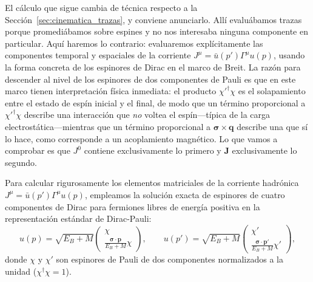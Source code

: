 \documentclass[10pt,a4paper]{article}
\begin{document}
El cálculo que sigue cambia de técnica respecto a la Sección~\ref{sec:cinematica_trazas}, y conviene anunciarlo. Allí evaluábamos trazas porque promediábamos sobre espines y no nos interesaba ninguna componente en particular. Aquí haremos lo contrario: evaluaremos explícitamente las componentes temporal y espaciales de la corriente $J^\mu = \bar{u}(p')\Gamma^\mu u(p)$, usando la forma concreta de los espinores de Dirac en el marco de Breit. La razón para descender al nivel de los espinores de dos componentes de Pauli es que en este marco tienen interpretación física inmediata: el producto $\chi'^\dagger\chi$ es el solapamiento entre el estado de espín inicial y el final, de modo que un término proporcional a $\chi'^\dagger\chi$ describe una interacción que \emph{no} voltea el espín---típica de la carga electrostática---mientras que un término proporcional a $\boldsymbol{\sigma}\times\mathbf{q}$ describe una que sí lo hace, como corresponde a un acoplamiento magnético. Lo que vamos a comprobar es que $J^0$ contiene exclusivamente lo primero y $\mathbf{J}$ exclusivamente lo segundo.

Para calcular rigurosamente los elementos matriciales de la corriente hadrónica $J^\mu = \bar{u}(p')\Gamma^\mu u(p)$, empleamos la solución exacta de espinores de cuatro componentes de Dirac para fermiones libres de energía positiva en la representación estándar de Dirac-Pauli:
\begin{equation}
u(p) = \sqrt{E_B + M} \begin{pmatrix} \chi \\ \frac{\boldsymbol{\sigma} \cdot \mathbf{p}}{E_B + M} \chi \end{pmatrix}, \qquad
u(p') = \sqrt{E_B + M} \begin{pmatrix} \chi' \\ \frac{\boldsymbol{\sigma} \cdot \mathbf{p}'}{E_B + M} \chi' \end{pmatrix},
\end{equation}
donde $\chi$ y $\chi'$ son espinores de Pauli de dos componentes normalizados a la unidad ($\chi^\dagger \chi = 1$).
\end{document}
